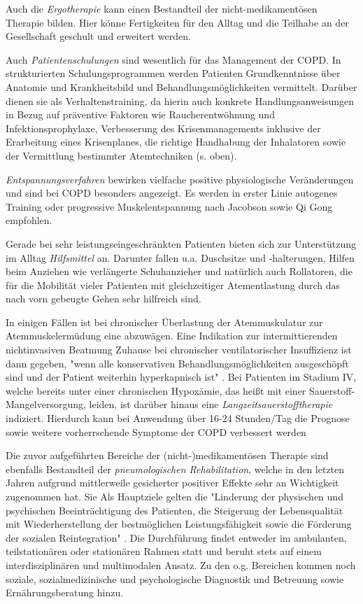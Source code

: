 Auch die \emph{Ergotherapie} kann einen Bestandteil der nicht-medikamentösen Therapie bilden. Hier könne Fertigkeiten für den Alltag und die Teilhabe an der Gesellschaft geschult und erweitert werden.

Auch \emph{Patientenschulungen} sind wesentlich für das Management der COPD. 
In strukturierten Schulungsprogrammen werden Patienten Grundkenntnisse über Anatomie und Krankheitsbild und Behandlungsmöglichkeiten vermittelt. Darüber dienen sie als Verhaltenstraining, da hierin auch konkrete Handlungsanweisungen in Bezug auf präventive Faktoren wie Raucherentwöhnung und Infektionsprophylaxe, Verbesserung des Krisenmanagements inklusive der Erarbeitung eines Krisenplanes, die richtige Handhabung der Inhalatoren sowie der Vermittlung bestimmter Atemtechniken (s. oben).

\emph{Entspannungsverfahren} bewirken vielfache positive physiologische Veränderungen und sind bei COPD besonders angezeigt. Es werden in erster Linie autogenes Training oder progressive Muskelentspannung nach Jacobson sowie Qi Gong empfohlen.

Gerade bei sehr leistungseingeschränkten Patienten bieten sich zur Unterstützung im Alltag \emph{Hilfsmittel} an. Darunter fallen u.a. Duschsitze und -halterungen, Hilfen beim Anziehen wie verlängerte Schuhanzieher und natürlich auch Rollatoren, die für die Mobilität vieler Patienten mit gleichzeitiger Atementlastung durch das nach vorn gebeugte Gehen sehr hilfreich sind.

In einigen Fällen ist bei chronischer Überlastung der Atemmuskulatur zur Atemmuskelermüdung eine  abzuwägen. Eine Indikation zur intermittierenden nichtinvasiven Beatmung Zuhause bei chronischer ventilatorischer Insuffizienz ist dann gegeben, "wenn alle konservativen Behandlungsmöglichkeiten ausgeschöpft sind und der Patient weiterhin hyperkapnisch ist" \autocite[e22]{vogelmeier2007}. Bei Patienten im Stadium IV, welche bereits unter einer chronischen Hypoxämie, das heißt mit einer Sauerstoff-Mangelversorgung, leiden, ist darüber hinaus eine \emph{Langzeitsauerstofftherapie} indiziert. Hierdurch kann bei Anwendung über 16-24 Stunden/Tag die Prognose sowie weitere vorherrschende Symptome der COPD verbessert werden \autocite[vgl.][e22]{vogelmeier2007}

Die zuvor aufgeführten Bereiche der (nicht-)medikamentösen Therapie sind ebenfalls Bestandteil der \emph{pneumologischen Rehabilitation}, welche in den letzten Jahren aufgrund mittlerweile gesicherter positiver Effekte sehr an Wichtigkeit zugenommen hat. Sie  Als Hauptziele gelten die "Linderung der physischen und psychischen Beeinträchtigung des Patienten, die Steigerung der Lebensqualität mit Wiederherstellung der bestmöglichen Leistungsfähigkeit sowie die Förderung der sozialen Reintegration" \autocite[e21]{vogelmeier2007}. Die Durchführung findet entweder im ambulanten, teilstationären oder stationären Rahmen statt und beruht stets auf einem interdisziplinären und multimodalen Ansatz. Zu den o.g. Bereichen kommen noch soziale, sozialmedizinische und psychologische Diagnostik und Betreuung sowie Ernährungsberatung hinzu. 

